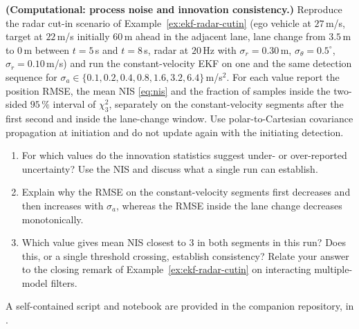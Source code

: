 \begin{prob}\label{prob:ch03:10}
\textbf{(Computational: process noise and innovation consistency.)} Reproduce the radar cut-in scenario of Example~\ref{ex:ekf-radar-cutin} (ego vehicle at $27$\,m/s, target at $22$\,m/s initially $60$\,m ahead in the adjacent lane, lane change from $3.5$\,m to $0$\,m between $t=5$\,s and $t=8$\,s, radar at $20$\,Hz with $\sigma_r=0.30$\,m, $\sigma_\theta=0.5^{\circ}$, $\sigma_{\dot r}=0.10$\,m/s) and run the constant-velocity EKF on one and the same detection sequence for $\sigma_a\in\{0.1,0.2,0.4,0.8,1.6,3.2,6.4\}$\,m/s$^{2}$. For each value report the position RMSE, the mean NIS \eqref{eq:nis} and the fraction of samples inside the two-sided $95\,\%$ interval of $\chi^{2}_{3}$, separately on the constant-velocity segments after the first second and inside the lane-change window. Use polar-to-Cartesian covariance propagation at initiation and do not update again with the initiating detection.
\begin{enumerate}
\item[(a)] For which values do the innovation statistics suggest under- or over-reported uncertainty? Use the NIS and discuss what a single run can establish.
\item[(b)] Explain why the RMSE on the constant-velocity segments first decreases and then increases with $\sigma_a$, whereas the RMSE inside the lane change decreases monotonically.
\item[(c)] Which value gives mean NIS closest to $3$ in both segments in this run? Does this, or a single threshold crossing, establish consistency? Relate your answer to the closing remark of Example~\ref{ex:ekf-radar-cutin} on interacting multiple-model filters.
\end{enumerate}
A self-contained script and notebook are provided in the companion repository, in .
\end{prob}

